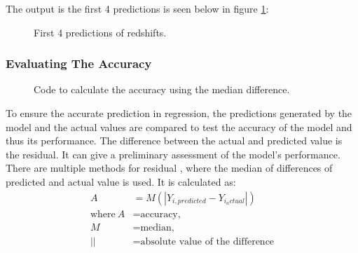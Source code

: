 The output is the first 4 predictions is seen below in figure \ref{fig:prro}:
\begin{figure}[H]
	\centering        {}
	\caption{First 4 predictions of redshifts.}
	\label{fig:prro}
\end{figure}

\subsubsection{Evaluating The Accuracy}
\begin{figure}[H]
	\centering
	\caption{Code to calculate the accuracy using the median difference.}
	\label{fig:acr}
\end{figure}
To ensure the accurate prediction in regression, the predictions generated by the model and the actual values are compared to test the accuracy of the model and thus its performance. The difference between the actual and predicted value is the residual. It can give a preliminary assessment of the model's performance. There are multiple methods for residual \parencite{liitiainen_residual_2009}, where the median of differences of predicted and actual value is used. It is calculated as:
\begin{align*}
	A&=M(|Y_{i,predicted} - Y_{i_actual}|)\\
	\text{where}~A &= \text{accuracy,}\\
	M&=\text{median,}\\
	||&=\text{absolute value of the difference}
\end{align*}
